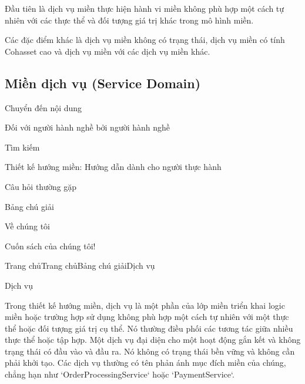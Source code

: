 Đầu tiên là dịch vụ miền thực hiện hành vi miền không phù hợp một cách tự nhiên với các thực thể và đối tượng giá trị khác trong mô hình miền.

Các đặc điểm khác là dịch vụ miền không có trạng thái, dịch vụ miền có tính Cohasset cao và dịch vụ miền với các dịch vụ miền khác.









\subsection{Miền dịch vụ (Service Domain)}







Chuyển đến nội dung

Đối với người hành nghề bởi người hành nghề

Tìm kiếm

Thiết kế hướng miền: Hướng dẫn dành cho người thực hành

Câu hỏi thường gặp

Bảng chú giải

Về chúng tôi

Cuốn sách của chúng tôi!

Trang chủTrang chủBảng chú giảiDịch vụ

Dịch vụ

Trong thiết kế hướng miền, dịch vụ là một phần của lớp miền triển khai logic miền hoặc trường hợp sử dụng không phù hợp một cách tự nhiên với một thực thể hoặc đối tượng giá trị cụ thể. Nó thường điều phối các tương tác giữa nhiều thực thể hoặc tập hợp. Một dịch vụ đại diện cho một hoạt động gắn kết và không trạng thái có đầu vào và đầu ra. Nó không có trạng thái bền vững và không cần phải khởi tạo. Các dịch vụ thường có tên phản ánh mục đích miền của chúng, chẳng hạn như `OrderProcessingService` hoặc `PaymentService`.

